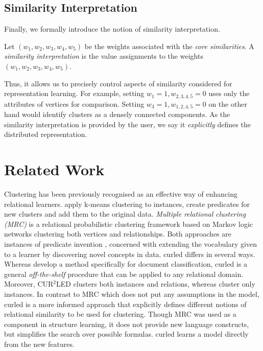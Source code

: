 \subsection{Similarity Interpretation}

Finally, we formally introduce the notion of similarity interpretation.

\begin{definition}
Let $(w_1,w_2,w_3,w_4,w_5)$ be the weights associated with the \textit{core similarities}.
A \textit{similarity interpretation} is the value assignments to the weights $(w_1,w_2,w_3,w_4,w_5)$.
\end{definition}

Thus, it allows us to precisely control aspects of similarity considered for representation learning.
For example, setting $w_1 = 1, w_{2,3,4,5} = 0$ uses only the attributes of vertices for comparison.
Setting $w_3 = 1, w_{1,2,4,5} = 0$ on the other hand would identify clusters as a densely connected components.
As the similarity interpretation is provided by the user, we say it \textit{explicitly} defines the distributed representation.




\section{Related Work}
\label{sec:Related}

Clustering has been previously recognised as an effective way of enhancing relational learners.
\cite{Popescul2004}  apply k-means clustering to instances, create predicates for new clusters and add them to the original data.
\textit{Multiple relational clustering (MRC)} \cite{Kok2007,Kok2008} is a relational probabilistic clustering framework based on Markov logic networks \cite{Richardson2006} clustering both vertices and relationships.
Both approaches are instances of predicate invention \cite{Kramer1995,Craven2001}, concerned with extending the vocabulary given to a learner by discovering novel concepts in data.
\gls{curled} differs in several ways.
Whereas \cite{Popescul2004} develop a method specifically  for document classification, \gls{curled} is a general \textit{off-the-shelf} procedure that can be applied to any relational domain.
Moreover, CUR$^2$LED clusters both instances and relations, whereas \cite{Popescul2004} cluster only instances.
In contrast to MRC which does not put any assumptions in the model, \gls{curled} is a more informed approach that explicitly defines different notions of relational similarity to be used for clustering.
Though MRC was used as a component in structure learning, it does not provide new language constructs, but simplifies the search over possible formulas.
\gls{curled} learns a model directly from the new features.


